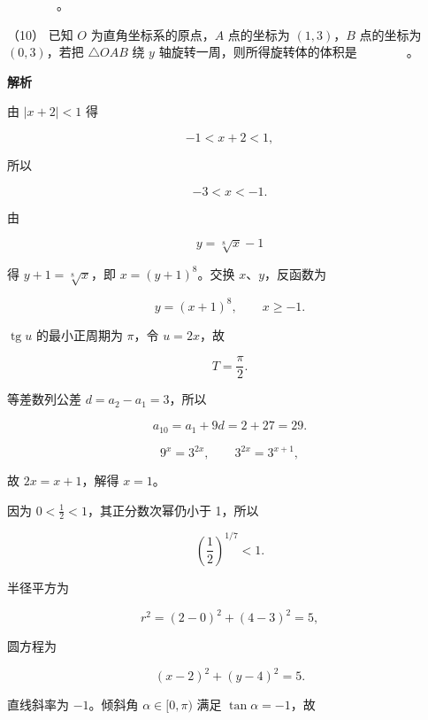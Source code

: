 \begin{answer}
　　　　。

（10） 已知 $O$ 为直角坐标系的原点，$A$ 点的坐标为 $(1,3)$，$B$ 点的坐标为 $(0,3)$，若把 $\triangle OAB$ 绕 $y$ 轴旋转一周，则所得旋转体的体积是　　　　。

\textbf{解析}


由 $|x+2|<1$ 得

\nopagebreak[4]
\[
-1<x+2<1,
\]

所以

\nopagebreak[4]
\[
-3<x<-1.
\]


由

\nopagebreak[4]
\[
y=\sqrt[8]{x}-1
\]

得 $y+1=\sqrt[8]{x}$，即 $x=(y+1)^8$。交换 $x\text{、}y$，反函数为

\nopagebreak[4]
\[
y=(x+1)^8,\qquad x\ge-1.
\]


$\operatorname{tg}u$ 的最小正周期为 $\pi$，令 $u=2x$，故

\nopagebreak[4]
\[
T=\frac\pi2.
\]


等差数列公差 $d=a_2-a_1=3$，所以

\nopagebreak[4]
\[
a_{10}=a_1+9d=2+27=29.
\]


\nopagebreak[4]
\[
9^x=3^{2x},\qquad 3^{2x}=3^{x+1},
\]

故 $2x=x+1$，解得 $x=1$。


因为 $0<\frac12<1$，其正分数次幂仍小于 1，所以

\nopagebreak[4]
\[
\left(\frac12\right)^{1/7}<1.
\]


半径平方为

\nopagebreak[4]
\[
r^2=(2-0)^2+(4-3)^2=5,
\]

圆方程为

\nopagebreak[4]
\[
(x-2)^2+(y-4)^2=5.
\]


直线斜率为 $-1$。倾斜角 $\alpha\in[0,\pi)$ 满足 $\tan\alpha=-1$，故


\end{answer}
